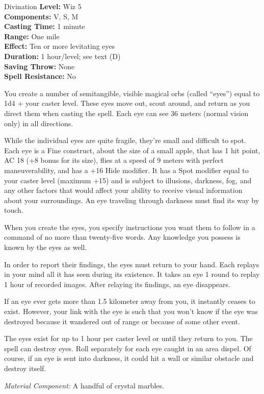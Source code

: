 {Divination}
{
	\textbf{Level:}
	Wiz 5\\
	\textbf{Components:}
	V, S, M\\
	\textbf{Casting Time:}
	1 minute\\
	\textbf{Range:}
	One mile\\
	\textbf{Effect:}
	Ten or more levitating eyes\\
	\textbf{Duration:}
	1 hour/level; see text (D)\\
	\textbf{Saving Throw:}
	None\\
	\textbf{Spell Resistance:}
	No\\
}
{
	You create a number of semitangible, visible magical orbs (called ``eyes'') equal to 1d4 + your caster level. These eyes move out, scout around, and return as you direct them when casting the spell. Each eye can see 36 meters (normal vision only) in all directions.

	While the individual eyes are quite fragile, they're small and difficult to spot. Each eye is a Fine construct, about the size of a small apple, that has 1 hit point, AC 18 (+8 bonus for its size), flies at a speed of 9 meters with perfect maneuverability, and has a +16 Hide modifier. It has a Spot modifier equal to your caster level (maximum +15) and is subject to illusions, darkness, fog, and any other factors that would affect your ability to receive visual information about your surroundings. An eye traveling through darkness must find its way by touch.

	When you create the eyes, you specify instructions you want them to follow in a command of no more than twenty-five words. Any knowledge you possess is known by the eyes as well.

	In order to report their findings, the eyes must return to your hand. Each replays in your mind all it has seen during its existence. It takes an eye 1 round to replay 1 hour of recorded images. After relaying its findings, an eye disappears.

	If an eye ever gets more than 1.5 kilometer away from you, it instantly ceases to exist. However, your link with the eye is such that you won't know if the eye was destroyed because it wandered out of range or because of some other event.

	The eyes exist for up to 1 hour per caster level or until they return to you. The  spell can destroy eyes. Roll separately for each eye caught in an area dispel. Of course, if an eye is sent into darkness, it could hit a wall or similar obstacle and destroy itself.

	\textit{Material Component:}
	A handful of crystal marbles.

}
